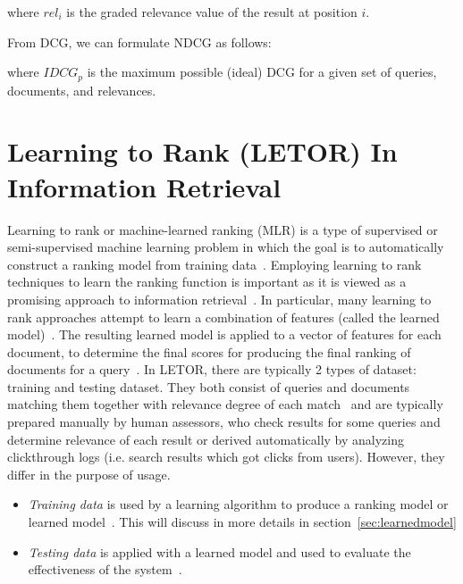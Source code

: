 \begin{center}
\end{center}

where $rel_{i}$ is the graded relevance value of the result at position $i$.

From DCG, we can formulate NDCG as follows:
\begin{center}
\end{center}
where $IDCG_p$ is the maximum possible (ideal) DCG for a given set of queries, documents, and relevances.


\section{Learning to Rank (LETOR) In Information Retrieval}\label{sec:letor}
Learning to rank or machine-learned ranking (MLR) is a type of supervised or semi-supervised machine learning problem in which the goal is 
to automatically construct a ranking model from training data~\cite{letor}.
Employing learning to rank techniques to learn the ranking function is important as it is viewed as
a promising approach to information retrieval~\cite{letor}. In particular, many learning to rank approaches attempt to learn a combination of features
(called the learned model)~\cite[P. 3]{learningmodel}. The resulting learned model is applied to a vector of features for each document, to determine the final scores for 
producing the final ranking of documents for a query~\cite[P. 3]{learningmodel}. In LETOR, there are typically 2 types of dataset: training and testing dataset.
They both consist of queries and documents matching them together with relevance degree of each match~\cite{letorWiki} and are typically
prepared manually by human assessors, who check results for some queries and determine relevance of each result or 
derived automatically by analyzing clickthrough logs (i.e. search results which got clicks from users). However, they differ in the purpose of usage.
\begin{itemize}
 \item \textit{Training data} is used by a learning algorithm to produce a ranking model or learned model~\cite{letorWiki}. 
 This will discuss in more details in section~\ref{sec:learnedmodel}
 \item \textit{Testing data} is applied with a learned model and used to evaluate the effectiveness of the system~\cite{craig}.
\end{itemize}

